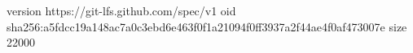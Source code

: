 version https://git-lfs.github.com/spec/v1
oid sha256:a5fdcc19a148ac7a0c3ebd6e463f0f1a21094f0ff3937a2f44ae4f0af473007e
size 22000
